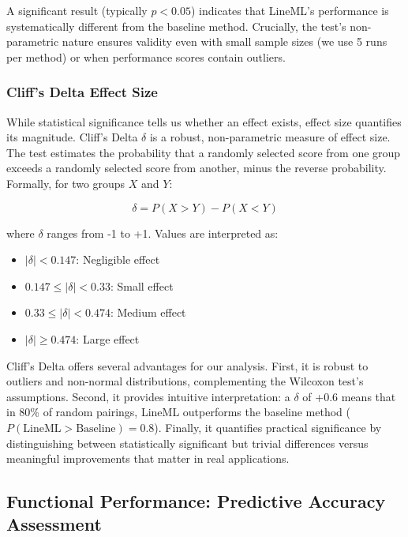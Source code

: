 \documentclass[pdflatex,sn-mathphys-num]{sn-jnl}%
\theoremstyle{thmstyleone}%
\theoremstyle{thmstyletwo}%
\theoremstyle{thmstylethree}%
\theoremstyle{plain} %
\theoremstyle{definition} %
\theoremstyle{remark} %
\theoremstyle{plain} %
\begin{document}
A significant result (typically $p < 0.05$) indicates that LineML's performance is systematically different from the baseline method. 
Crucially, the test's non-parametric nature ensures validity even with small sample sizes (we use 5 runs per method) or when performance scores contain outliers.

\subsubsection{Cliff's Delta Effect Size}
While statistical significance tells us whether an effect exists, effect size quantifies its magnitude. 
Cliff's Delta $\delta$ \cite{cliff1993dominance} is a robust, non-parametric measure of effect size.
The test estimates the probability that a randomly selected score from one group exceeds a randomly selected score from another, minus the reverse probability. 
Formally, for two groups $X$ and $Y$:

\[
\delta = P(X > Y) - P(X < Y)
\]

where $\delta$ ranges from -1 to +1. Values are interpreted as:
\begin{itemize}[noitemsep,topsep=2pt]
    \item $|\delta| < 0.147$: Negligible effect
    \item $0.147 \leq |\delta| < 0.33$: Small effect
    \item $0.33 \leq |\delta| < 0.474$: Medium effect
    \item $|\delta| \geq 0.474$: Large effect
\end{itemize}

Cliff's Delta offers several advantages for our analysis. 
First, it is robust to outliers and non-normal distributions, complementing the Wilcoxon test's assumptions. 
Second, it provides intuitive interpretation: a $\delta$ of +0.6 means that in 80\% of random pairings, LineML outperforms the baseline method ($P(\text{LineML} > \text{Baseline}) = 0.8$). 
Finally, it quantifies practical significance by distinguishing between statistically significant but trivial differences versus meaningful improvements that matter in real applications.



\subsection{Functional Performance: Predictive Accuracy Assessment}
\end{document}
